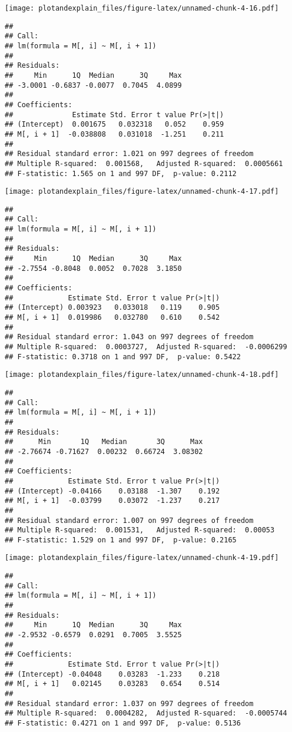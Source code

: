 \documentclass[]{article}
\begin{document}
\texttt{[image: plotandexplain\_files/figure-latex/unnamed-chunk-4-16.pdf]}

\begin{verbatim}
## 
## Call:
## lm(formula = M[, i] ~ M[, i + 1])
## 
## Residuals:
##     Min      1Q  Median      3Q     Max 
## -3.0001 -0.6837 -0.0077  0.7045  4.0899 
## 
## Coefficients:
##              Estimate Std. Error t value Pr(>|t|)
## (Intercept)  0.001675   0.032318   0.052    0.959
## M[, i + 1]  -0.038808   0.031018  -1.251    0.211
## 
## Residual standard error: 1.021 on 997 degrees of freedom
## Multiple R-squared:  0.001568,   Adjusted R-squared:  0.0005661 
## F-statistic: 1.565 on 1 and 997 DF,  p-value: 0.2112
\end{verbatim}

\texttt{[image: plotandexplain\_files/figure-latex/unnamed-chunk-4-17.pdf]}

\begin{verbatim}
## 
## Call:
## lm(formula = M[, i] ~ M[, i + 1])
## 
## Residuals:
##     Min      1Q  Median      3Q     Max 
## -2.7554 -0.8048  0.0052  0.7028  3.1850 
## 
## Coefficients:
##             Estimate Std. Error t value Pr(>|t|)
## (Intercept) 0.003923   0.033018   0.119    0.905
## M[, i + 1]  0.019986   0.032780   0.610    0.542
## 
## Residual standard error: 1.043 on 997 degrees of freedom
## Multiple R-squared:  0.0003727,  Adjusted R-squared:  -0.0006299 
## F-statistic: 0.3718 on 1 and 997 DF,  p-value: 0.5422
\end{verbatim}

\texttt{[image: plotandexplain\_files/figure-latex/unnamed-chunk-4-18.pdf]}

\begin{verbatim}
## 
## Call:
## lm(formula = M[, i] ~ M[, i + 1])
## 
## Residuals:
##      Min       1Q   Median       3Q      Max 
## -2.76674 -0.71627  0.00232  0.66724  3.08302 
## 
## Coefficients:
##             Estimate Std. Error t value Pr(>|t|)
## (Intercept) -0.04166    0.03188  -1.307    0.192
## M[, i + 1]  -0.03799    0.03072  -1.237    0.217
## 
## Residual standard error: 1.007 on 997 degrees of freedom
## Multiple R-squared:  0.001531,   Adjusted R-squared:  0.00053 
## F-statistic: 1.529 on 1 and 997 DF,  p-value: 0.2165
\end{verbatim}

\texttt{[image: plotandexplain\_files/figure-latex/unnamed-chunk-4-19.pdf]}

\begin{verbatim}
## 
## Call:
## lm(formula = M[, i] ~ M[, i + 1])
## 
## Residuals:
##     Min      1Q  Median      3Q     Max 
## -2.9532 -0.6579  0.0291  0.7005  3.5525 
## 
## Coefficients:
##             Estimate Std. Error t value Pr(>|t|)
## (Intercept) -0.04048    0.03283  -1.233    0.218
## M[, i + 1]   0.02145    0.03283   0.654    0.514
## 
## Residual standard error: 1.037 on 997 degrees of freedom
## Multiple R-squared:  0.0004282,  Adjusted R-squared:  -0.0005744 
## F-statistic: 0.4271 on 1 and 997 DF,  p-value: 0.5136
\end{verbatim}
\end{document}
